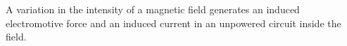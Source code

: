 A variation in the intensity of a magnetic field generates an
induced electromotive force and an induced current %
in an unpowered circuit inside the field. 